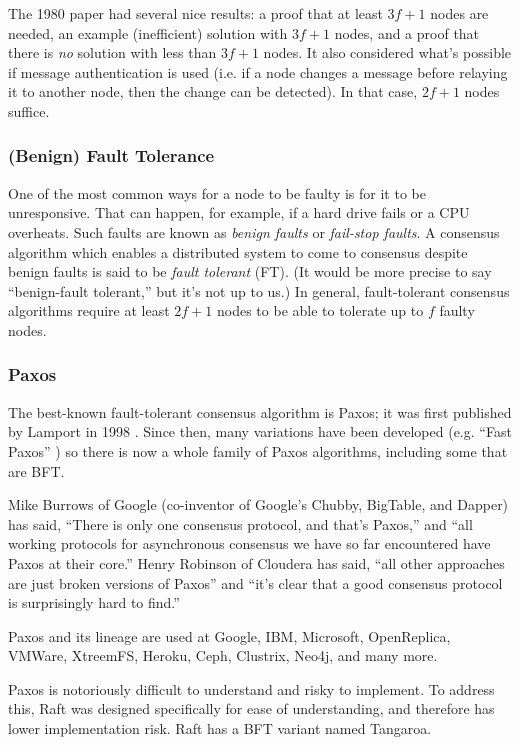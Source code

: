 The 1980 paper had several nice results:
a proof that at least $3f+1$ nodes are needed,
an example (inefficient) solution with $3f+1$ nodes, 
and a proof that there is \emph{no} solution with less than $3f+1$ nodes.
It also considered what's possible if message authentication is used (i.e. if a node changes a message before relaying it to another node, then the change can be detected). In that case, $2f+1$ nodes suffice.

\subsubsection{(Benign) Fault Tolerance}
One of the most common ways for a node to be faulty is for it to be unresponsive. That can happen, for example, if a hard drive fails or a CPU overheats. Such faults are known as \emph{benign faults} or \emph{fail-stop faults}. A consensus algorithm which enables a distributed system to come to consensus despite benign faults is said to be \emph{fault tolerant} (FT). (It would be more precise to say ``benign-fault tolerant,'' but it's not up to us.) In general, fault-tolerant consensus algorithms require at least $2f+1$ nodes to be able to tolerate up to $f$ faulty nodes.

\subsubsection{Paxos}
The best-known fault-tolerant consensus algorithm is Paxos; it was first published by Lamport in 1998 \cite{lamport1998part}. Since then, many variations have been developed (e.g. ``Fast Paxos'' \cite{lamport2006fast}) so there is now a whole family of Paxos algorithms, including some that are BFT. \cite{lamport2011byzantizing}

Mike Burrows of Google (co-inventor of Google’s Chubby, BigTable, and Dapper) has said, ``There is only one consensus protocol, and that’s Paxos,'' \cite{robinson2009paxos} and ``all working protocols for asynchronous consensus we have so far encountered have Paxos at their core.'' \cite{burrows2006chubby}
Henry Robinson of Cloudera has said, ``all other approaches are just broken versions of Paxos'' and ``it’s clear that a good consensus protocol is surprisingly hard to find.'' \cite{robinson2009paxos}

Paxos and its lineage are used at Google, IBM, Microsoft, OpenReplica, VMWare, XtreemFS, Heroku, Ceph, Clustrix, Neo4j, and many more. \cite{wiki_paxos}

Paxos is notoriously difficult to understand and risky to implement.
To address this, Raft \cite{ongaro2014raft} was designed specifically for ease of understanding, and therefore has lower implementation risk.
Raft has a BFT variant named Tangaroa. \cite{copeland2014tangaroa}

